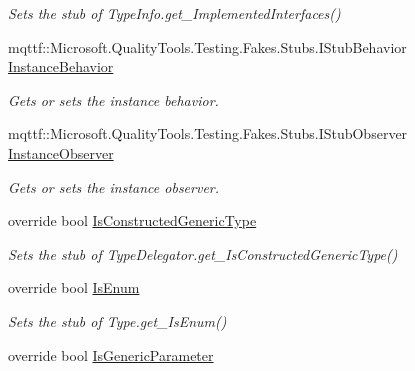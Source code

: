 \begin{DoxyCompactItemize}
\begin{DoxyCompactList}\small\item\em Sets the stub of Type\-Info.\-get\-\_\-\-Implemented\-Interfaces()\end{DoxyCompactList}\item 
mqttf\-::\-Microsoft.\-Quality\-Tools.\-Testing.\-Fakes.\-Stubs.\-I\-Stub\-Behavior \hyperlink{class_system_1_1_reflection_1_1_fakes_1_1_stub_type_delegator_ae916bb0761cac939fb978db54a1d6859}{Instance\-Behavior}
\begin{DoxyCompactList}\small\item\em Gets or sets the instance behavior.\end{DoxyCompactList}\item 
mqttf\-::\-Microsoft.\-Quality\-Tools.\-Testing.\-Fakes.\-Stubs.\-I\-Stub\-Observer \hyperlink{class_system_1_1_reflection_1_1_fakes_1_1_stub_type_delegator_a4bbf8898d59884d8d5fc232d48933112}{Instance\-Observer}
\begin{DoxyCompactList}\small\item\em Gets or sets the instance observer.\end{DoxyCompactList}\item 
override bool \hyperlink{class_system_1_1_reflection_1_1_fakes_1_1_stub_type_delegator_a971a56d4284b72c44b76bb17428b967a}{Is\-Constructed\-Generic\-Type}
\begin{DoxyCompactList}\small\item\em Sets the stub of Type\-Delegator.\-get\-\_\-\-Is\-Constructed\-Generic\-Type()\end{DoxyCompactList}\item 
override bool \hyperlink{class_system_1_1_reflection_1_1_fakes_1_1_stub_type_delegator_ae961ba962f7d7c98360430acbd7a58ac}{Is\-Enum}
\begin{DoxyCompactList}\small\item\em Sets the stub of Type.\-get\-\_\-\-Is\-Enum()\end{DoxyCompactList}\item 
override bool \hyperlink{class_system_1_1_reflection_1_1_fakes_1_1_stub_type_delegator_a20c35b830a475727e119e25aff2dc3d8}{Is\-Generic\-Parameter}

\end{DoxyCompactItemize}
